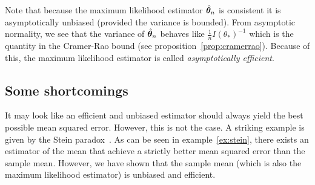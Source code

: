 Note that because the maximum likelihood estimator $\hat{\boldsymbol{\theta}}_n$ is
consistent it is asymptotically unbiased (provided the variance is bounded).
From asymptotic normality, we see that the
variance of $\hat{\boldsymbol{\theta}}_n$ behaves like $\frac1{n}I(\theta_*)^{-1}$ which is
the quantity in the Cramer-Rao bound (see proposition~\ref{prop:cramerrao}).
Because of this, the maximum likelihood estimator is called \emph{asymptotically
  efficient}.

\subsection{Some shortcomings}
It may look like an efficient and unbiased estimator should always yield the
best possible mean squared error.
However, this is not the case. A striking example is given by the Stein paradox~\cite{stein1956inadmissibility}.
As can be seen in example~\ref{ex:stein}, there exists an estimator of the mean
that achieve a strictly better mean squared error than the sample mean.
However, we have shown that the sample mean (which is also the maximum
likelihood estimator) is unbiased and efficient. 
